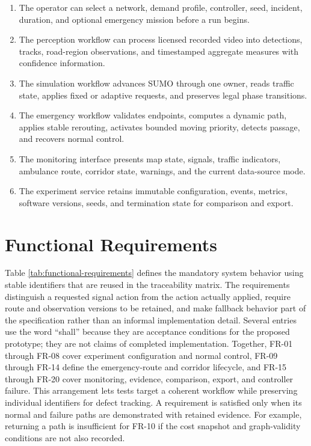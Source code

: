 \begin{enumerate}
\item The operator can select a network, demand profile, controller, seed, incident, duration, and optional emergency mission before a run begins.
\item The perception workflow can process licensed recorded video into detections, tracks, road-region observations, and timestamped aggregate measures with confidence information.
\item The simulation workflow advances SUMO through one owner, reads traffic state, applies fixed or adaptive requests, and preserves legal phase transitions.
\item The emergency workflow validates endpoints, computes a dynamic path, applies stable rerouting, activates bounded moving priority, detects passage, and recovers normal control.
\item The monitoring interface presents map state, signals, traffic indicators, ambulance route, corridor state, warnings, and the current data-source mode.
\item The experiment service retains immutable configuration, events, metrics, software versions, seeds, and termination state for comparison and export.
\end{enumerate}

\section{Functional Requirements}

Table \ref{tab:functional-requirements} defines the mandatory system behavior using stable identifiers that are reused in the traceability matrix. The requirements distinguish a requested signal action from the action actually applied, require route and observation versions to be retained, and make fallback behavior part of the specification rather than an informal implementation detail. Several entries use the word ``shall'' because they are acceptance conditions for the proposed prototype; they are not claims of completed implementation. Together, FR-01 through FR-08 cover experiment configuration and normal control, FR-09 through FR-14 define the emergency-route and corridor lifecycle, and FR-15 through FR-20 cover monitoring, evidence, comparison, export, and controller failure. This arrangement lets tests target a coherent workflow while preserving individual identifiers for defect tracking. A requirement is satisfied only when its normal and failure paths are demonstrated with retained evidence. For example, returning a path is insufficient for FR-10 if the cost snapshot and graph-validity conditions are not also recorded.

